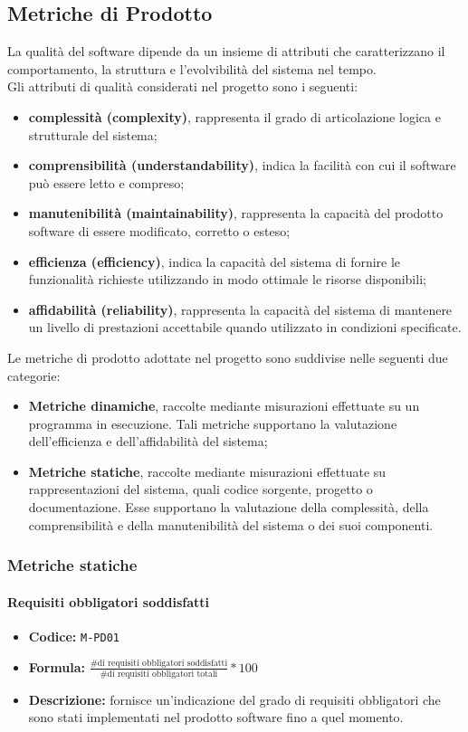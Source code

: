 \documentclass[a4paper,12pt]{article}
\begin{document}
\subsection{Metriche di Prodotto}
La qualità del software dipende da un insieme di attributi che caratterizzano il comportamento, la struttura e l’evolvibilità del sistema nel tempo.\\
Gli attributi di qualità considerati nel progetto sono i seguenti:
\begin{itemize}
    \item \textbf{complessità (complexity)}, rappresenta il grado di articolazione logica e strutturale del sistema;
    \item \textbf{comprensibilità (understandability)}, indica la facilità con cui il software può essere letto e compreso;
    \item \textbf{manutenibilità (maintainability)}, rappresenta la capacità del prodotto software di essere modificato, corretto o esteso;
    \item \textbf{efficienza (efficiency)}, indica la capacità del sistema di fornire le funzionalità richieste utilizzando in modo ottimale le risorse disponibili;
    \item \textbf{affidabilità (reliability)}, rappresenta la capacità del sistema di mantenere un livello di prestazioni accettabile quando utilizzato in condizioni specificate.
\end{itemize}
Le metriche di prodotto adottate nel progetto sono suddivise nelle seguenti due categorie:
\begin{itemize}
    \item \textbf{Metriche dinamiche}, raccolte mediante misurazioni effettuate su un programma in esecuzione. Tali metriche supportano la valutazione dell’efficienza e dell’affidabilità del sistema;
    \item \textbf{Metriche statiche}, raccolte mediante misurazioni effettuate su rappresentazioni del sistema, quali codice sorgente, progetto o documentazione. Esse supportano la valutazione della complessità, della comprensibilità e della manutenibilità del sistema o dei suoi componenti.
\end{itemize}

\subsubsection{Metriche statiche}

\paragraph{Requisiti obbligatori soddisfatti}
\begin{itemize}
    \item \textbf{Codice:} \texttt{M-PD01}
    \item \textbf{Formula:} $\frac{\text{\# di requisiti obbligatori soddisfatti}}{\text{\# di requisiti obbligatori totali}}*100$
    \item \textbf{Descrizione:} fornisce un'indicazione del grado di requisiti obbligatori che sono stati implementati nel prodotto software fino a quel momento.
\end{itemize}
\end{document}
